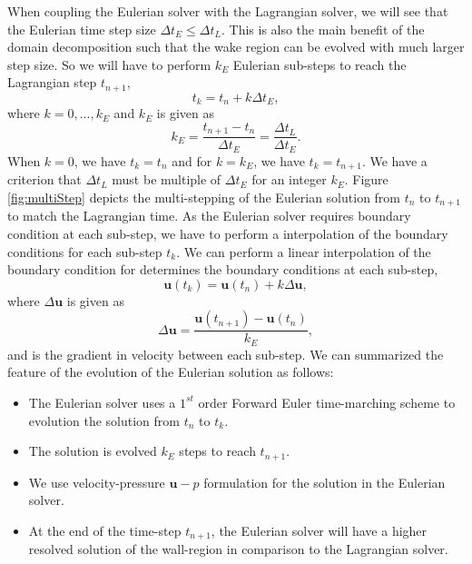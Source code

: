 When coupling the Eulerian solver with the Lagrangian solver, we will see that the Eulerian time step size $\Delta t_E \leqslant \Delta t_L$. This is also the main benefit of the domain decomposition such that the wake region can be evolved with much larger step size. So we will have to perform $k_E$ Eulerian sub-steps to reach the Lagrangian step $t_{n+1}$,
\begin{equation}
t_{k} = t_n + k\Delta t_E,
\end{equation}
where $k = 0,...,k_E$ and $k_E$ is given as
\begin{equation}
k_E = \frac{t_{n+1}-t_{n}}{\Delta t_E} = \frac{\Delta t_L}{\Delta t_E}.
\label{eq:timeStepDependency}
\end{equation}
When $k=0$, we have $t_k = t_n$ and for $k=k_E$, we have $t_k = t_{n+1}$. We have a criterion that $\Delta t_L$ must be multiple of $\Delta t_E$ for an integer $k_E$. Figure \ref{fig:multiStep} depicts the multi-stepping of the Eulerian solution from $t_n$ to $t_{n+1}$ to match the Lagrangian time. As the Eulerian solver requires boundary condition at each sub-step, we have to perform a interpolation of the boundary conditions for each sub-step $t_k$. We can perform a linear interpolation of the boundary condition for determines the boundary conditions at each sub-step,
\begin{equation}
\mathbf{u}(t_k) = \mathbf{u}(t_n) + k \Delta \mathbf{u},
\end{equation}
where $\Delta \mathbf{u}$ is given as
\begin{equation}
\Delta \mathbf{u} = \frac{\mathbf{u}(t_{n+1})-\mathbf{u}(t_n)}{k_E},
\end{equation}
and is the gradient in velocity between each sub-step. We can summarized the feature of the evolution of the Eulerian solution as follows:
\begin{itemize}
\item The Eulerian solver uses a $1^{st}$ order Forward Euler time-marching scheme to evolution the solution from $t_n$ to $t_k$.
\item The solution is evolved $k_E$ steps to reach $t_{n+1}$.
\item We use velocity-pressure $\mathbf{u}-p$ formulation for the solution in the Eulerian solver.
\item At the end of the time-step $t_{n+1}$, the Eulerian solver will have a higher resolved solution of the wall-region in comparison to the Lagrangian solver.
\end{itemize}

